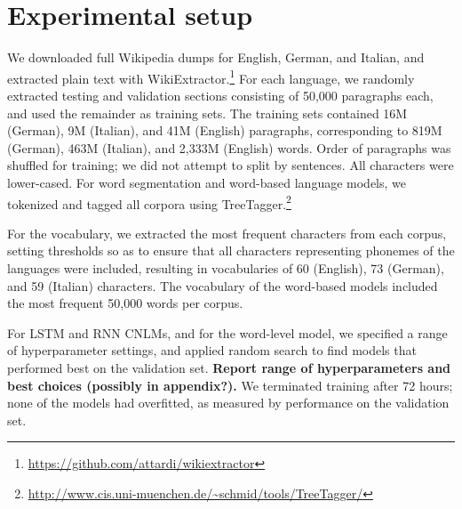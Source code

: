 \section{Experimental setup}
\label{sec:setup}

We downloaded full Wikipedia dumps for English, German, and Italian, and extracted plain text with WikiExtractor.\footnote{\url{https://github.com/attardi/wikiextractor}}
For each language, we randomly extracted testing and validation sections consisting of 50,000 paragraphs each, and used the remainder as training sets.
The training sets contained 16M (German), 9M (Italian), and 41M (English) paragraphs, corresponding to 819M (German), 463M (Italian), and 2,333M (English) words.
Order of paragraphs was shuffled for training; we did not attempt to split by sentences.
All characters were lower-cased.
For word segmentation and word-based language models, we tokenized and tagged all corpora using TreeTagger.\footnote{\url{http://www.cis.uni-muenchen.de/~schmid/tools/TreeTagger/}}

For the vocabulary, we extracted the most frequent characters from
each corpus, setting thresholds so as to ensure that all characters
representing phonemes of the languages were included, resulting in vocabularies of 60 (English), 73 (German), and 59 (Italian) characters.
The vocabulary of the word-based models
included the most frequent 50,000 words per corpus.



For LSTM and RNN CNLMs, and for the word-level model, we specified a range of hyperparameter settings, and applied random search to find models that performed best on the validation set. \textbf{Report range of hyperparameters and best choices (possibly in appendix?).}
We terminated training after 72 hours; none of the models had overfitted, as measured by performance on the validation set.

